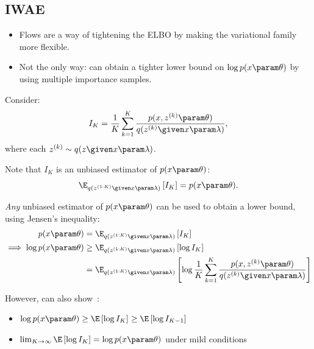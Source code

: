 \subsection{IWAE}
\begin{frame}
\begin{itemize}
    \item Flows are a way of tightening the ELBO by making the variational family more flexible. 
    \item Not the only way: can obtain a tighter lower bound on $\log p(x \param \theta)$ by using multiple importance samples.
\end{itemize}

    \air
    \air
\pause
    Consider:
    \begin{align*}
        I_K = \frac{1}{K} \sum_{k=1}^K \frac{p(x, z^{(k)} \param \theta)}{q(z^{(k)} \given x \param \lambda)},
    \end{align*}
    where each $z^{(k)} \sim q(z \given x \param \lambda)$.
    
    \air
    \air
    Note that $I_K$ is an unbiased estimator of $p(x \param \theta)$:
    \begin{align*}
        \E_{q(z^{(1:K)} \given x \param \lambda)} \left[I_K \right] = p(x \param \theta).
    \end{align*}

\air
% 
\end{frame}


\begin{frame}
    \textit{Any} unbiased estimator of $p(x \param \theta)$ can be used to obtain a lower bound, using Jensen's inequality:
    \begin{align*}
        p(x \param \theta) &= \E_{q(z^{(1:K)} \given x \param \lambda)} \left[ I_K \right] \\
        \implies \log p(x \param \theta) &\geq \E_{q(z^{(1:K)} \given x \param \lambda)} \left[ \log I_K \right] \\
        &= \E_{q(z^{(1:K)} \given x \param \lambda)} \left[ \log \frac{1}{K} \sum_{k=1}^K \frac{p(x, z^{(k)} \param \theta)}{q(z^{(k)} \given x \param \lambda)} \right]
    \end{align*}

However, can also show~\citep{Burda2015}:
\begin{itemize}
    \item $\log p(x \param \theta) \geq \E \left[ \log I_K \right] \geq \E \left[ \log I_{K-1} \right]$
    \item $\lim_{K \rightarrow \infty} \E \left[ \log I_K \right] = \log p(x \param \theta)$ under mild conditions
\end{itemize}
\end{frame}


